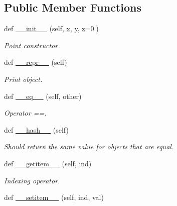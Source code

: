 \subsection*{Public Member Functions}
\begin{DoxyCompactItemize}
\item 
def \hyperlink{classgeometry_1_1Point_accb3af71f20d5531f1a478c4f5ca8105}{\+\_\+\+\_\+init\+\_\+\+\_\+} (self, \hyperlink{classgeometry_1_1Point_a98f21eef44d1c182f04f1262c90815fc}{x}, \hyperlink{classgeometry_1_1Point_a4ef9a436e11219296ba5e3fff9e87711}{y}, \hyperlink{classgeometry_1_1Point_afd1ce6427fa3e28c9c42934bb5d76165}{z}=0.)
\begin{DoxyCompactList}\small\item\em \hyperlink{classgeometry_1_1Point}{Point} constructor. \end{DoxyCompactList}\item 
def \hyperlink{classgeometry_1_1Point_aebe045ef26f241b525459dfa1ee3b85f}{\+\_\+\+\_\+repr\+\_\+\+\_\+} (self)
\begin{DoxyCompactList}\small\item\em Print object. \end{DoxyCompactList}\item 
\mbox{\label{classgeometry_1_1Point_a9cbf68fff40fffb87e6acff640c95294}} 
def \hyperlink{classgeometry_1_1Point_a9cbf68fff40fffb87e6acff640c95294}{\+\_\+\+\_\+eq\+\_\+\+\_\+} (self, other)
\begin{DoxyCompactList}\small\item\em Operator ==. \end{DoxyCompactList}\item 
def \hyperlink{classgeometry_1_1Point_ae9e26dfa297c49feb6e0c2808c74bba8}{\+\_\+\+\_\+hash\+\_\+\+\_\+} (self)
\begin{DoxyCompactList}\small\item\em Should return the same value for objects that are equal. \end{DoxyCompactList}\item 
def \hyperlink{classgeometry_1_1Point_a68cd5b720a72a8c546c2b11b60d2dd76}{\+\_\+\+\_\+getitem\+\_\+\+\_\+} (self, ind)
\begin{DoxyCompactList}\small\item\em Indexing operator. \end{DoxyCompactList}\item 
def \hyperlink{classgeometry_1_1Point_aae8560cc5718faf25f3cb70942a32395}{\+\_\+\+\_\+setitem\+\_\+\+\_\+} (self, ind, val)

\end{DoxyCompactItemize}
